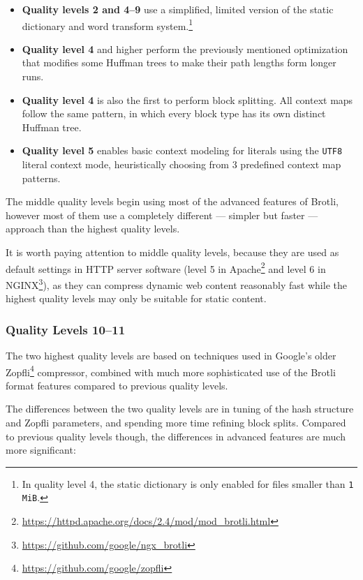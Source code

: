 \documentclass[english,master,dept460,male,cpp,cpdeclaration]{diploma}
\newcommand{\nosep}{\itemsep0em}
\begin{document}
		\begin{itemize} \nosep
			\item \textbf{Quality levels 2 and 4--9} use a simplified, limited version of the static dictionary and word transform system.\footnote{In quality level 4, the static dictionary is only enabled for files smaller than \texttt{1 MiB}.}
			\item \textbf{Quality level 4} and higher perform the previously mentioned optimization that modifies some Huffman trees to make their path lengths form longer runs.
			\item \textbf{Quality level 4} is also the first to perform block splitting. All context maps follow the same pattern, in which every block type has its own distinct Huffman tree.
			\item \textbf{Quality level 5} enables basic context modeling for literals using the \verb|UTF8| literal context mode, heuristically choosing from 3 predefined context map patterns.
		\end{itemize}
		
		\noindent
		The middle quality levels begin using most of the advanced features of Brotli, however most of them use a completely different --- simpler but faster --- approach than the highest quality levels.
		
		It is worth paying attention to middle quality levels, because they are used as default settings in HTTP server software (level 5 in Apache\footnote{\url{https://httpd.apache.org/docs/2.4/mod/mod\_brotli.html}} and level 6 in NGINX\footnote{\url{https://github.com/google/ngx\_brotli}}), as they can compress dynamic web content reasonably fast while the highest quality levels may only be suitable for static content.
		
		\subsubsection{Quality Levels 10--11}
		
		The two highest quality levels are based on techniques used in Google's older Zopfli\footnote{\url{https://github.com/google/zopfli}} compressor, combined with much more sophisticated use of the Brotli format features compared to previous quality levels.
		
		
		The differences between the two quality levels are in tuning of the hash structure and Zopfli parameters, and spending more time refining block splits. Compared to previous quality levels though, the differences in advanced features are much more significant:
		
\end{document}
